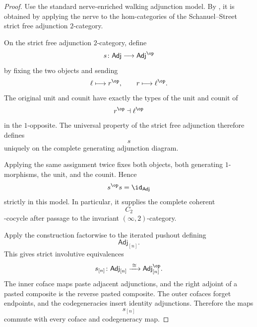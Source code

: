 \begin{proof}
Use the standard nerve-enriched walking adjunction model. By
\cite[Corollary~3.3.5]{RiehlVerityHomotopyCoherentAdjunctions}, it is
obtained by applying the nerve to the hom-categories of the
Schanuel--Street strict free adjunction $2$-category.

On the strict free adjunction $2$-category, define
\[
    s
    \colon
    \mathsf{Adj}
    \longrightarrow
    \mathsf{Adj}^{\op}
\]
by fixing the two objects and sending
\[
    \ell\longmapsto r^{\op},
    \qquad
    r\longmapsto\ell^{\op}.
\]
The original unit and counit have exactly the types of the unit and
counit of
\[
    r^{\op}\dashv\ell^{\op}
\]
in the $1$-opposite. The universal property of the strict free
adjunction therefore defines
\[
    s
\]
uniquely on the complete generating adjunction diagram.

Applying the same assignment twice fixes both objects, both generating
$1$-morphisms, the unit, and the counit. Hence
\[
    s^{\op}s
    =
    \id_{\mathsf{Adj}}
\]
strictly in this model. In particular, it supplies the complete coherent
\[
    C_2
\]
-cocycle after passage to the invariant $(\infty,2)$-category.

Apply the construction factorwise to the iterated pushout defining
\[
    \mathsf{Adj}_{[n]}.
\]
This gives strict involutive equivalences
\[
    s_{[n]}
    \colon
    \mathsf{Adj}_{[n]}
    \xrightarrow{\;\cong\;}
    \mathsf{Adj}_{[n]}^{\op}.
\]
The inner coface maps paste adjacent adjunctions, and the right adjoint of
a pasted composite is the reverse pasted composite. The outer cofaces
forget endpoints, and the codegeneracies insert identity adjunctions.
Therefore the maps
\[
    s_{[n]}
\]
commute with every coface and codegeneracy map.
\end{proof}

